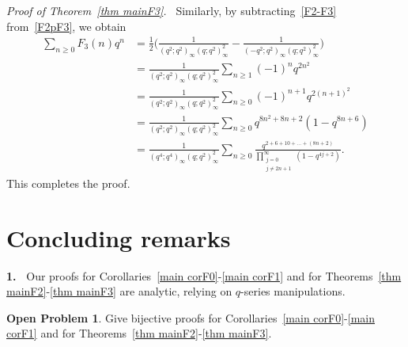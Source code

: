 \documentclass{amsart}
\numberwithin{equation}{section}
\theoremstyle{definition}
\newtheorem{problem}{Open Problem}
\newcommand{\fr}{\frac}
\begin{document}
\emph{Proof of Theorem~\ref{thm mainF3}.\ } Similarly, by subtracting~\eqref{F2-F3} from~\eqref{F2pF3}, we obtain
\begin{align*}
\sum_{n\geq 0} F_3(n) q^n
&=\fr{1}{2} \Big( \fr{1}{(q^2;q^2)_\infty (q;q^2)_\infty^2} - \fr{1}{(-q^2;q^2)_\infty (q;q^2)_\infty^2} \Big) \\
&= \fr{1}{(q^2;q^2)_\infty (q;q^2)_\infty^2}  \sum_{n\geq 1}(-1)^n q^{2n^2}  \\
&= \fr{1}{(q^2;q^2)_\infty (q;q^2)_\infty^2}  \sum_{n\geq 0}(-1)^{n+1} q^{2(n+1)^2}  \\
&=\fr{1}{(q^2;q^2)_\infty (q;q^2)_\infty^2} \sum_{n\geq 0} q^{8n^2+8n+2} (1-q^{8n+6}) \\
&=\fr{1}{(q^4;q^4)_\infty (q;q^2)_\infty^2} \sum_{n\geq 0} \fr{q^{2+6+10+\ldots+(8n+2)}}
{\displaystyle{\prod_{\substack{j=0 \\ j\ne 2n+1}}^{\infty}} (1-q^{4j+2})}.
\end{align*}
This completes the proof.
%
\section{Concluding remarks}\label{sec comments}
%
{\bf 1.\ } Our proofs for Corollaries~\ref{main corF0}-\ref{main corF1} and for Theorems~\ref{thm mainF2}-\ref{thm mainF3} are
analytic, relying on $q$-series manipulations.
%
\begin{problem}
Give bijective proofs for Corollaries~\ref{main corF0}-\ref{main corF1} and for Theorems~\ref{thm mainF2}-\ref{thm mainF3}.
\end{problem}
\end{document}
